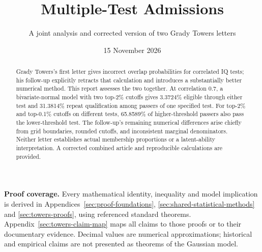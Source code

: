 
\newcommand{\sfN}{\overline{\Phi}}
\renewcommand{\ProjectReportRunningTitle}{Multiple-test admissions}
\renewcommand{\ProjectReportRunningSubtitle}{Joint analysis and corrected article}
\title{Multiple-Test Admissions}
\subtitle{A joint analysis and corrected version of two Grady Towers letters}
\author{\ProjectAuthor}
\date{15 November 2026}

\renewcommand{\ProjectReportHighlights}{Under joint normality with correlation \(0.7\), two top-\(2\%\)
cutoffs give approximately \textbf{3.3724\%} eligible through either
test and \textbf{31.3814\%} repeat qualification among passers of a specified
test. These are model probabilities, not observed society admissions.}


\frontmatter
\ProjectReportTitlePage
\begin{abstract}
Grady Towers's first letter gives incorrect overlap probabilities for
correlated IQ tests; his follow-up explicitly retracts that calculation and
introduces a substantially better numerical method. This report assesses
the two together. At correlation 0.7, a bivariate-normal model with two
top-2\% cutoffs gives 3.3724\% eligible through either test and 31.3814\%
repeat qualification among passers of one specified test. For top-2\% and
top-0.1\% cutoffs on different tests, 65.8589\% of higher-threshold passers
also pass the lower-threshold test. The follow-up's remaining numerical
differences arise chiefly from grid boundaries, rounded cutoffs, and
inconsistent marginal denominators. Neither letter establishes actual
membership proportions or a latent-ability interpretation. A corrected
combined article and reproducible calculations are provided.
\end{abstract}

\noindent\textbf{Proof coverage.} Every mathematical identity, inequality and
model implication is derived in Appendices~\ref{sec:proof-foundations},
\ref{sec:shared-statistical-methods} and \ref{sec:towers-proofs}, using
referenced standard theorems. Appendix~\ref{sec:towers-claim-map} maps all
claims to those proofs or to their documentary evidence. Decimal values are
numerical approximations; historical and empirical claims are not presented
as theorems of the Gaussian model.


